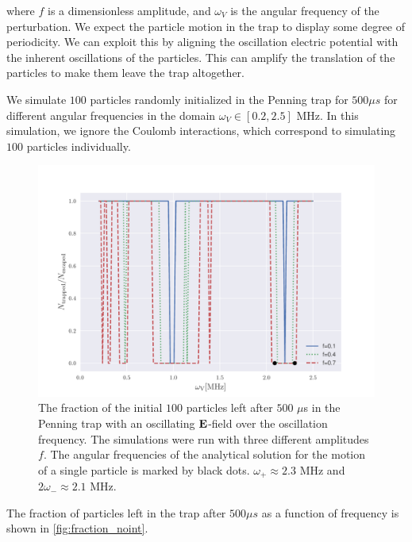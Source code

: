 where $f$ is a dimensionless amplitude, and $\omega_V$ is the angular frequency of the perturbation.
We expect the particle motion in the trap to display some degree of periodicity. We can exploit this
by aligning the oscillation electric potential with the inherent oscillations of the particles. This can amplify the translation of the particles to make them leave the trap altogether.

    We simulate $100$ particles randomly initialized in the Penning trap for $500 \mu s$ for
different angular frequencies in the domain $\omega_V \in [0.2, 2.5]$ MHz. In this simulation, we ignore the Coulomb interactions, which
correspond to simulating $100$ particles individually.

\begin{figure}
\centering
\includegraphics[width=1.\linewidth]{../figures/fraction_left_omega.pdf}
\caption{The fraction of the initial $100$ particles left after $500$ $\mu$s in the Penning trap with an oscillating $\bold{E}$-field over
the oscillation frequency. The simulations were run with three different amplitudes $f$. The angular frequencies of the analytical solution for the motion
of a single particle is marked by black dots. $\omega_{+} \approx 2.3$ MHz and $2\omega_{-} \approx 2.1$ MHz.}
\label{fig:fraction_noint}
\end{figure}

The fraction of particles left
in the trap after $500 \mu s$ as a function of frequency is shown in \autoref{fig:fraction_noint}.

